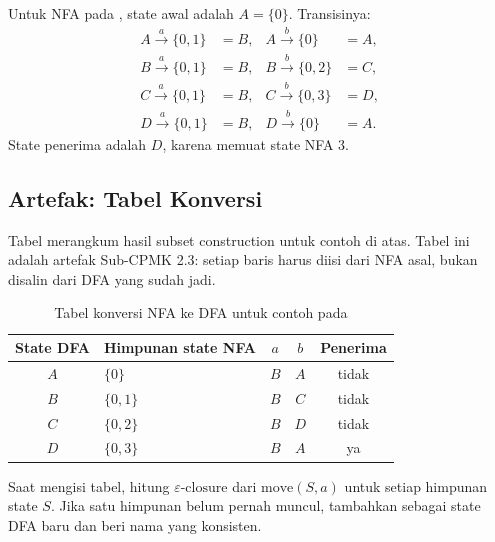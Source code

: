 Untuk NFA pada , state awal adalah
\(A = \{0\}\). Transisinya:
\[
\begin{aligned}
A \xrightarrow{a} \{0,1\} &= B, &
A \xrightarrow{b} \{0\} &= A,\\
B \xrightarrow{a} \{0,1\} &= B, &
B \xrightarrow{b} \{0,2\} &= C,\\
C \xrightarrow{a} \{0,1\} &= B, &
C \xrightarrow{b} \{0,3\} &= D,\\
D \xrightarrow{a} \{0,1\} &= B, &
D \xrightarrow{b} \{0\} &= A.
\end{aligned}
\]
State penerima adalah \(D\), karena memuat state NFA 3.

\subsection{Artefak: Tabel Konversi}

Tabel  merangkum hasil subset construction
untuk contoh di atas. Tabel ini adalah artefak Sub-CPMK 2.3: setiap
baris harus diisi dari NFA asal, bukan disalin dari DFA yang sudah
jadi.

\begin{table}[H]
\centering
\caption{Tabel konversi NFA ke DFA untuk contoh pada
}
\label{tab:ch06-konversi}
\begin{tabular}{@{}c l c c c@{}}
\toprule
\textbf{State DFA} & \textbf{Himpunan state NFA} &
\textbf{\(a\)} & \textbf{\(b\)} & \textbf{Penerima} \\
\midrule
\(A\) & \(\{0\}\) & \(B\) & \(A\) & tidak \\
\(B\) & \(\{0,1\}\) & \(B\) & \(C\) & tidak \\
\(C\) & \(\{0,2\}\) & \(B\) & \(D\) & tidak \\
\(D\) & \(\{0,3\}\) & \(B\) & \(A\) & ya \\
\bottomrule
\end{tabular}
\end{table}

Saat mengisi tabel, hitung \(\varepsilon\text{-closure}\) dari
\(\text{move}(S,a)\) untuk setiap himpunan state \(S\). Jika satu
himpunan belum pernah muncul, tambahkan sebagai state DFA baru dan
beri nama yang konsisten.

